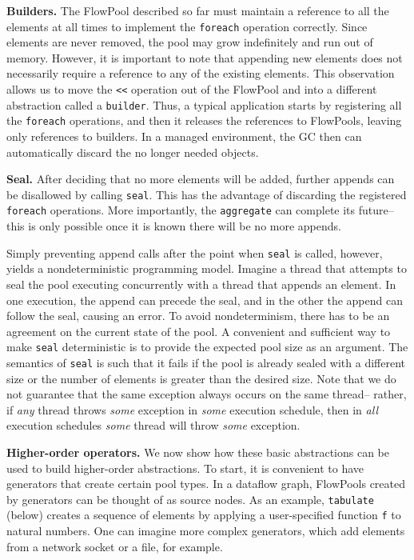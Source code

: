 \textbf{Builders.}
The FlowPool described so far must maintain a reference  to all the elements
at all times to implement the \verb=foreach= operation correctly. Since
elements are never removed, the pool may grow indefinitely and run out of
memory. However, it is important to note that appending new elements does not
necessarily require a reference to any of the existing elements. This
observation allows us to move the \verb=<<= operation out of the FlowPool and
into a different abstraction called a \verb=builder=. Thus, a typical
application starts by registering all the \verb=foreach= operations, and then
it releases the references to FlowPools, leaving only references to builders.
In a managed environment, the GC then can automatically discard the no longer
needed objects.


\textbf{Seal.}
After deciding that no more elements will be added,
further appends can be disallowed by calling \verb=seal=.
This has the advantage of discarding the registered \verb=foreach=
operations.
More importantly, the \verb=aggregate= can complete its future-- this is only possible
once it is known there will be no more appends.

Simply preventing append calls
after the point when \verb=seal= is called, however, yields a
nondeterministic programming model.
Imagine a thread that attempts to seal the pool executing concurrently
with a thread that appends an element.
In one execution, the append can precede the seal, and in the other
the append can follow the seal, causing an error.
To avoid nondeterminism, there has to be an agreement on the
current state of the pool.
A convenient and sufficient way to make \verb=seal= deterministic
is to provide the expected pool size as an argument.
The semantics of \verb=seal= is such that it fails if the pool
is already sealed with a different size or the number of elements
is greater than the desired size. Note that we do not guarantee that the
same exception always occurs on the same thread-- rather,
if \emph{any} thread throws \emph{some} exception in \emph{some} execution schedule,
then in \emph{all} execution schedules \emph{some} thread will throw \emph{some} exception.


\textbf{Higher-order operators.}
We now show how these basic abstractions can be used
to build higher-order abstractions.
To start, it is
convenient to have generators that create certain pool types.
In a dataflow graph, FlowPools created by generators
can be thought of as source nodes.
As an example, \verb=tabulate= (below) creates a sequence of elements
by applying a user-specified function \verb=f= to natural numbers.
One can imagine more complex generators, which add elements from a
network socket or a file, for example.

